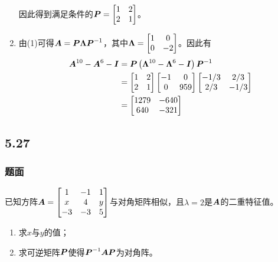 \documentclass{beamer}
\begin{document}
\begin{frame}[allowframebreaks]
\begin{enumerate}
{              因此得到满足条件的\(\boldsymbol{P}=\begin{bmatrix}1&2\\2&1\end{bmatrix}\)。
              }
        \item {
              由(1)可得\(\boldsymbol{A}=\boldsymbol{P}\boldsymbol{\Lambda}{\boldsymbol{P}}^{-1}\)，其中\(\boldsymbol{\Lambda}=\begin{bmatrix}1&0\\0&-2\end{bmatrix}\)。因此有
              \begin{align*}
                  \boldsymbol{A}^{10}-\boldsymbol{A}^6-\boldsymbol{I} & =\boldsymbol{P}\left( \boldsymbol{\Lambda}^{10}-\boldsymbol{\Lambda}^6-\boldsymbol{I} \right){\boldsymbol{P}}^{-1}                                                                       \\
                                           & =\begin{bmatrix}1&2\\2&1\end{bmatrix}\begin{bmatrix}-1&0\\0&959\end{bmatrix}\begin{bmatrix}-1/3&2/3\\2/3&-1/3\end{bmatrix} \\
                                           & =\begin{bmatrix}1279&-640\\640&-321\end{bmatrix}
              \end{align*}
              }
    \end{enumerate}
\end{frame}

\subsection*{5.27}
\begin{frame}
    \frametitle{题面}
    已知方阵\(\boldsymbol{A}=\begin{bmatrix}1&-1&1\\x&4&y\\-3&-3&5\end{bmatrix}\)与对角矩阵相似，且\(\lambda=2\)是\(\boldsymbol{A}\)的二重特征值。
    \begin{enumerate}
        \item 求\(x\)与\(y\)的值；
        \item 求可逆矩阵\(\boldsymbol{P}\)使得\({\boldsymbol{P}}^{-1}\boldsymbol{A}\boldsymbol{P}\)为对角阵。
    \end{enumerate}
\end{frame}
\end{document}
